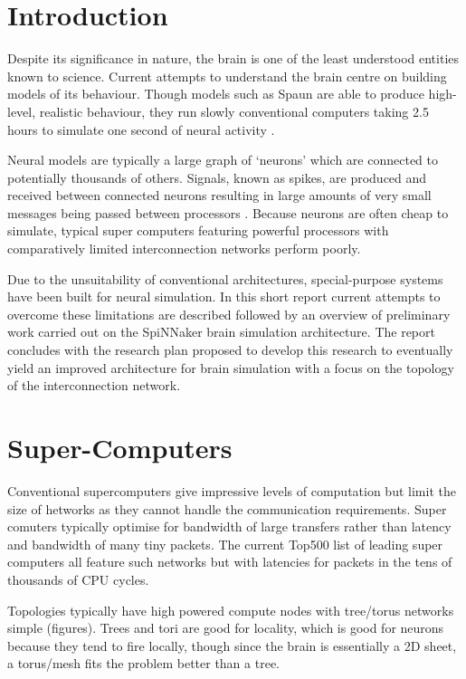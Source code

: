 \section{Introduction}
	
	Despite its significance in nature, the brain is one of the least understood
	entities known to science. Current attempts to understand the brain centre on
	building models of its behaviour. Though models such as Spaun are able to
	produce high-level, realistic behaviour, they run slowly conventional
	computers taking 2.5 hours to simulate one second of neural activity
	\cite{eliasmith12}.
	
	Neural models are typically a large graph of `neurons' which are connected to
	potentially thousands of others. Signals, known as spikes, are produced and
	received between connected neurons resulting in large amounts of very small
	messages being passed between processors \cite{vainbrand11}.  Because neurons
	are often cheap to simulate, typical super computers featuring powerful
	processors with comparatively limited interconnection networks perform poorly.
	
	Due to the unsuitability of conventional architectures, special-purpose
	systems have been built for neural simulation. In this short report current
	attempts to overcome these limitations are described followed by an overview
	of preliminary work carried out on the SpiNNaker brain simulation
	architecture. The report concludes with the research plan proposed to develop
	this research to eventually yield an improved architecture for brain
	simulation with a focus on the topology of the interconnection network.

\section{Super-Computers}

Conventional supercomputers give impressive levels of computation but limit the
size of hetworks as they cannot handle the communication requirements. Super
comuters typically optimise for bandwidth of large transfers rather than latency
and bandwidth of many tiny packets. The current Top500 list of leading super
computers all feature such networks but with latencies for packets in the tens
of thousands of CPU cycles.

Topologies typically have high powered compute nodes with tree/torus networks
simple (figures). Trees and tori are good for locality, which is good for
neurons because they tend to fire locally, though since the brain is essentially
a 2D sheet, a torus/mesh fits the problem better than a tree.

